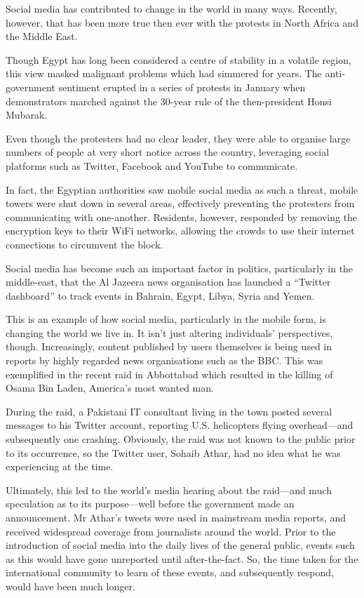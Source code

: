 \documentclass[a4paper,11pt]{article}
\begin{document}
    Social media has contributed to change in the world in many ways. Recently,
    however, that has been more true then ever with the protests in North
    Africa and the Middle East.

    Though Egypt has long been considered a centre of stability in a volatile
    region, this view masked malignant problems which had simmered for years.
    The anti-government sentiment erupted in a series of protests in January
    when demonstrators marched against the 30-year rule of the then-president
    Honsi Mubarak.

    Even though the protesters had no clear leader, they were able to organise
    large numbers of people at very short notice across the country, leveraging
    social platforms such as Twitter, Facebook and YouTube to communicate.

    In fact, the Egyptian authorities saw mobile social media as such a threat,
    mobile towers were shut down in several areas, effectively preventing the
    protesters from communicating with one-another. Residents, however,
    responded by removing the encryption keys to their WiFi networks, allowing
    the crowds to use their internet connections to circumvent the block.

    Social media has become such an important factor in politics, particularly
    in the middle-east, that the Al Jazeera news organisation has launched
    a ``Twitter dashboard'' to track events in Bahrain, Egypt, Libya, Syria and
    Yemen.

    This is an example of how social media, particularly in the mobile form, is
    changing the world we live in. It isn't just altering individuals'
    perspectives, though. Increasingly, content published by users themselves
    is being used in reports by highly regarded news organisations such as the
    BBC. This was exemplified in the recent raid in Abbottabad which resulted
    in the killing of Osama Bin Laden, America's most wanted man.

    During the raid, a Pakistani IT consultant living in the town posted
    several messages to his Twitter account, reporting U.S. helicopters flying
    overhead---and subsequently one crashing. Obviously, the raid was not known
    to the public prior to its occurrence, so the Twitter user, Sohaib Athar,
    had no idea what he was experiencing at the time.

    Ultimately, this led to the world's media hearing about the raid---and much
    speculation as to its purpose---well before the government made an
    announcement. Mr Athar's tweets were used in mainstream media reports, and
    received widespread coverage from journalists around the world. Prior to
    the introduction of social media into the daily lives of the general
    public, events such as this would have gone unreported until
    after-the-fact. So, the time taken for the international community to learn
    of these events, and subsequently respond, would have been much longer.
\end{document}
